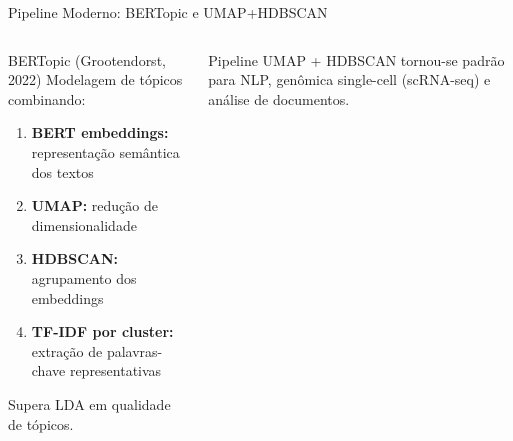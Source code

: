 \documentclass[aspectratio=169]{beamer}
\begin{document}
\begin{frame}{Pipeline Moderno: BERTopic e UMAP+HDBSCAN}
    \begin{columns}
        \begin{block}{BERTopic (Grootendorst, 2022)}
            \footnotesize
            Modelagem de tópicos combinando:
            \begin{enumerate}\footnotesize
                \item \textbf{BERT embeddings:} representação semântica dos textos
                \item \textbf{UMAP:} redução de dimensionalidade
                \item \textbf{HDBSCAN:} agrupamento dos embeddings
                \item \textbf{TF-IDF por cluster:} extração de palavras-chave representativas
            \end{enumerate}
            Supera LDA em qualidade de tópicos.
        \end{block}
        \begin{alertblock}{}
            \footnotesize Pipeline UMAP + HDBSCAN tornou-se padrão para NLP, genômica single-cell (scRNA-seq) e análise de documentos.
        \end{alertblock}
        \centering
    \end{columns}
\end{frame}
\end{document}
